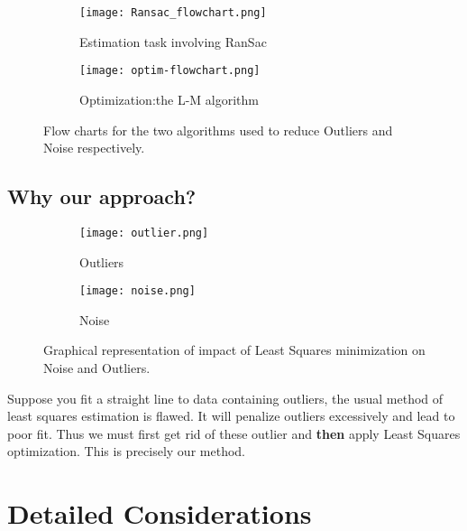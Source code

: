 \documentclass[titlepage]{article}
\begin{document}
\begin{figure}[H]
\begin{subfigure}{0.5\textwidth}
   \texttt{[image: Ransac\_flowchart.png]}
   \caption{Estimation task involving RanSac}
   \label{Ransac_Flow}
\end{subfigure} 
\begin{subfigure}{0.5\textwidth}
    \texttt{[image: optim-flowchart.png]}
    \caption{Optimization:the L-M algorithm}
  \label{Optim_Flow}
\end{subfigure} 
\caption{Flow charts for the two algorithms used to reduce Outliers and Noise respectively.}
\end{figure}
\subsection{Why our approach?}
\begin{figure}[H]
\begin{subfigure}{0.5\textwidth}
\texttt{[image: outlier.png]}
\caption{Outliers}
\label{Ransac_Flow}
\end{subfigure} 
\begin{subfigure}{0.5\textwidth}
\texttt{[image: noise.png]}
\caption{Noise}
\label{Optim_Flow}
\end{subfigure} 
\caption{Graphical representation of impact of Least Squares minimization on Noise and Outliers.}
\end{figure}
Suppose you fit a straight line to data containing outliers, the usual method of least squares estimation is flawed. It will penalize outliers excessively and lead to poor fit. Thus we must first get rid of these outlier and \textbf{then} apply Least Squares optimization. This is precisely our method.

\section{Detailed Considerations}
\end{document}
